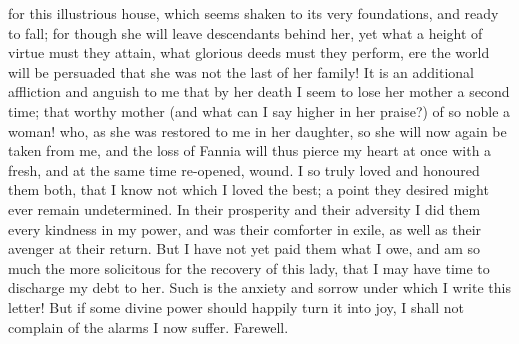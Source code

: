 for this illustrious house, which seems shaken to its very foundations,
and ready to fall; for though she will leave descendants behind her, yet
what a height of virtue must they attain, what glorious deeds must they
perform, ere the world will be persuaded that she was not the last of her
family! It is an additional affliction and anguish to me that by her death
I seem to lose her mother a second time; that worthy mother (and what can
I say higher in her praise?) of so noble a woman! who, as she was restored
to me in her daughter, so she will now again be taken from me, and the
loss of Fannia will thus pierce my heart at once with a fresh, and at the
same time re-opened, wound. I so truly loved and honoured them both, that
I know not which I loved the best; a point they desired might ever remain
undetermined. In their prosperity and their adversity I did them every
kindness in my power, and was their comforter in exile, as well as their
avenger at their return. But I have not yet paid them what I owe, and am
so much the more solicitous for the recovery of this lady, that I may have
time to discharge my debt to her. Such is the anxiety and sorrow under
which I write this letter! But if some divine power should happily turn it
into joy, I shall not complain of the alarms I now suffer. Farewell.


